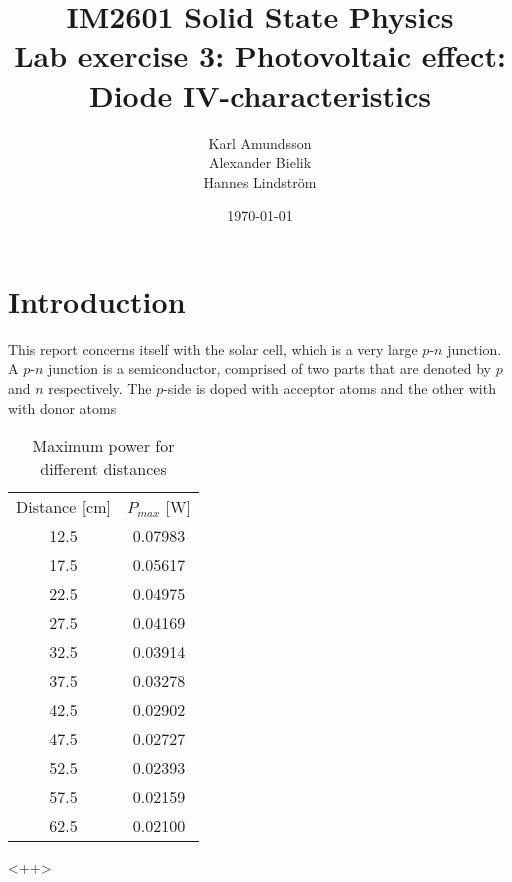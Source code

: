 \documentclass[a4paper]{article}
\theoremstyle{definition}
\begin{document}
\title{IM2601 Solid State Physics \\ Lab exercise 3: Photovoltaic effect: Diode IV-characteristics}
\author{Karl Amundsson \\ Alexander Bielik \\ Hannes Lindström}
\date{\today}
\maketitle
\newpage
\tableofcontents
\newpage
\section{Introduction}
This report concerns itself with the solar cell, which is a very large $p$-$n$ junction.
A $p$-$n$ junction is a semiconductor, comprised of two parts that are denoted by $p$ and $n$ respectively.
The $p$-side is doped with acceptor atoms and the other with with donor atoms
\begin{table}
  \centering
  \begin{tabular}{|c|c|}
    \hline
    Distance [cm] & $P_{max}$ [W] \\
    12.5 & 0.07983 \\
    17.5 & 0.05617 \\
    22.5 & 0.04975 \\
    27.5 & 0.04169 \\
    32.5 & 0.03914 \\
    37.5 & 0.03278 \\
    42.5 & 0.02902 \\
    47.5 & 0.02727 \\
    52.5 & 0.02393 \\
    57.5 & 0.02159 \\
    62.5 & 0.02100 \\
    \hline
  \end{tabular}
  \caption{Maximum power for different distances}
  \label{tab:<+label+>}
\end{table}<++>
\end{document}
